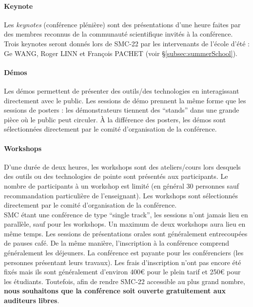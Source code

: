 \documentclass[fontsize=12pt]{scrartcl} %
\numberwithin{equation}{section} %
\numberwithin{figure}{section} %
\numberwithin{table}{section} %
\begin{document}
\paragraph{\textbf{Keynote}} Les \textit{keynotes} (conférence plénière) sont des présentations d'une heure faites par des membres reconnus de la communauté scientifique invités à la conférence. Trois keynotes seront donnés lors de SMC-22 par les intervenants de l'école d'été : Ge WANG, Roger LINN et François PACHET (voir \S\ref{subsec:summerSchool}).

\paragraph{\textbf{Démos}} Les démos permettent de présenter des outils/des technologies en interagissant directement avec le public. Les sessions de démo prennent la même forme que les sessions de posters : les démonstrateurs tiennent des ``stands'' dans une grande pièce où le public peut circuler. À la différence des posters, les démos sont sélectionnées directement par le comité d'organisation de la conférence.

\paragraph{\textbf{Workshops}} D'une durée de deux heures, les workshops sont des ateliers/cours lors desquels des outils ou des technologies de pointe sont présentés aux participants. Le nombre de participants à un workshop est limité (en général 30 personnes sauf recommandation particulière de l'enseignant). Les workshops sont sélectionnés directement par le comité d'organisation de la conférence.\\

SMC étant une conférence de type ``single track'', les sessions n'ont jamais lieu en parallèle, sauf pour les workshops. Un maximum de deux workshops aura lieu en même temps. Les sessions de présentations orales sont généralement entrecoupées de pauses café. De la même manière, l'inscription à la conférence comprend généralement les déjeuners. La conférence est payante pour les conférenciers (les personnes présentant leurs travaux). Les frais d'inscription n'ont pas encore été fixés mais ils sont généralement d'environ 400\euro{} pour le plein tarif et 250\euro{} pour les étudiants. Toutefois, afin de rendre SMC-22 accessible au plus grand nombre, \textbf{nous souhaitons que la conférence soit ouverte gratuitement aux auditeurs libres}.
\end{document}
